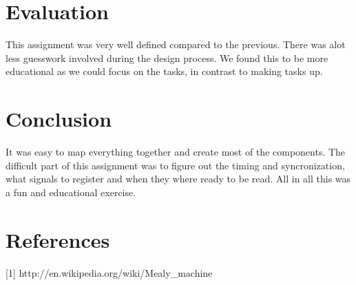 \documentclass[11pt]{report}
\begin{document}
\section*{Evaluation}


This assignment was very well defined compared to the previous. There was
alot less guesswork involved during the design process. We found this to
be more educational as we could focus on the tasks, in contrast to
making tasks up.

\section*{Conclusion}


It was easy to map everything together and create most of the components. 
The difficult part of this assignment was to figure out the timing 
and syncronization, what signals to register and when they where 
ready to be read. All in all this was a fun and educational exercise.

\section*{References}

[1] http://en.wikipedia.org/wiki/Mealy\_machine
\end{document}
